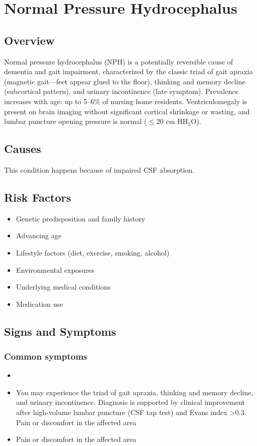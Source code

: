\chapter{Normal Pressure Hydrocephalus}
\label{sec:Normal Pressure Hydrocephalus}

\section{Overview}
Normal pressure hydrocephalus (NPH) is a potentially reversible cause of dementia and gait impairment, characterized by the classic triad of gait apraxia (magnetic gait---feet appear glued to the floor), thinking and memory decline (subcortical pattern), and urinary incontinence (late symptom). Prevalence increases with age: up to 5--6\% of nursing home residents. Ventriculomegaly is present on brain imaging without significant cortical shrinkage or wasting, and lumbar puncture opening pressure is normal ($\leq$20 cm HH$_2$O).
\section{Causes}
This condition happens because of impaired CSF absorption.     
\section{Risk Factors}

\begin{itemize}[noitemsep]
  \item Genetic predisposition and family history
  \item Advancing age
  \item Lifestyle factors (diet, exercise, smoking, alcohol)
  \item Environmental exposures
  \item Underlying medical conditions
  \item Medication use
\end{itemize}
\section{Signs and Symptoms}

\subsection{Common symptoms}
\begin{itemize}[noitemsep]
  \item \item You may experience the triad of gait apraxia, thinking and memory decline, and urinary incontinence. Diagnosis is supported by clinical improvement after high-volume lumbar puncture (CSF tap test) and Evans index >0.3. Pain or discomfort in the affected area    \item Pain or discomfort in the affected area
  \end{itemize}

